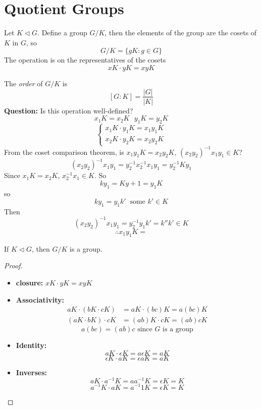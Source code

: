 \documentclass[openany]{report}
\begin{document}
\section{Quotient Groups}
\begin{definition}
    Let $K \triangleleft G$. Define a group $G/K$, then the elements of the group are the cosets of $K$ in $G$, so 
    \[G/K = \{gK : g \in G\}\]
    The operation is on the representatives of the cosets
    \[xK \cdot yK = xyK\]
\end{definition}
\noindent
The \emph{order} of $G / K$ is 
\[[G:K] = \frac{|G|}{|K|}\]
\textbf{Question:} Is this operation well-defined? 
\[x_1K = x_2K \ \ \ y_1K = y_2K\]
\[\begin{cases}
    x_1K \cdot y_1K = x_1y_1K\\
    x_2K \cdot y_2K = x_2y_2K
\end{cases}\]
From the coset comparison theorem, is $x_1y_1K = x_2y_2K$, $(x_2y_2)^{-1}x_1y_1 \in K$?
\[(x_2y_2)^{-1}x_1y_1 = y_2^{-1}x_2^{-1}x_1y_1 = y_2^{-1}Ky_1\]
Since $x_1K = x_2K$, $x_2^{-1}x_1 \in K$. So
\[ky_1 = Ky+1 = y_1K\]
so 
\[ky_1 = y_1k' \ \text{ some } k' \in K\]
Then 
\[(x_2y_2)^{-1}x_1y_1 = y_2^{-1}y_1k' = k''k' \in K\]
\[\therefore x_1y_1K = \]
\begin{theorem}
    If $K \triangleleft G$, then $G / K$ is a group.
\end{theorem}
\begin{proof}
    \begin{itemize}
        \item \textbf{closure:} $xK \cdot yK = xyK$
        \item \textbf{Associativity:}
        \begin{align*}
            aK \cdot (bK \cdot cK) &= aK \cdot (bc)K = a(bc)K\\
            (aK \cdot bK) \cdot cK &= (ab)K \cdot cK = (ab)cK
        \end{align*} 
        \[a(bc) = (ab)c \text{ since $G$ is a group}\]
        \item \textbf{Identity:} 
        \[aK \cdot \epsilon K = a\epsilon K = a K\]
        \[\epsilon K \cdot aK = \epsilon aK = a K\]
        \item \textbf{Inverses:}
        \[aK \cdot a^{-1}K = aa^{-1}K = \epsilon K = K\]
        \[a^{-1}K \cdot aK =a^{-1}1K = \epsilon K = K \]
    \end{itemize}
\end{proof}
\end{document}
